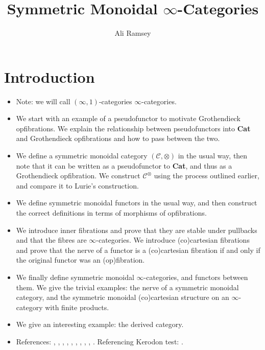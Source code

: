 \documentclass{MetricNotes2023}
\author{Ali Ramsey}
\title{Symmetric Monoidal \(\infty\)-Categories}
\date{\vspace{-5ex}}
\begin{document}
\maketitle
%

\DeclarePairedDelimiter{\norm}{\lVert}{\rVert} 
\DeclarePairedDelimiter{\abs}{\lvert}{\rvert} 
\DeclarePairedDelimiter{\ang}{\langle}{\rangle} 

\section{Introduction}

\begin{itemize}
\item Note: we will call \((\infty, 1)\)-categories \(\infty\)-categories. 
\item We start with an example of a pseudofunctor to motivate Grothendieck opfibrations. We explain the relationship between pseudofunctors into \textbf{Cat} and Grothendieck opfibrations and how to pass between the two.
\item We define a symmetric monoidal category \((	\mathcal{C},\otimes)\) in the usual way, then note that it can be written as a pseudofunctor to \textbf{Cat}, and thus as a Grothendieck opfibration. We construct \(\mathcal{C}^\otimes\) using the process outlined earlier, and compare it to Lurie's construction. 
\item We define symmetric monoidal functors in the usual way, and then construct the correct definitions in terms of morphisms of opfibrations.
\item We introduce inner fibrations and prove that they are stable under pullbacks and that the fibres are \(\infty\)-categories. We introduce (co)cartesian fibrations and prove that the nerve of a functor is a (co)cartesian fibration if and only if the original functor was an (op)fibration. 
\item We finally define symmetric monoidal \(\infty\)-categories, and functors between them. We give the trivial examples: the nerve of a symmetric monoidal category, and the symmetric monoidal (co)cartesian structure on an \(\infty\)-category with finite products.
\item We give an interesting example: the derived category.
\item References:
\autocite{goodfibrations}, \autocite{categorical},  \autocite{symmetricmonoidal}, \autocite{groth2015short}, \autocite{2dimensional},  \autocite{fibrational_notions},  \autocite{higheralgebra}, \autocite{lurie2008higher}, \autocite{kerodon}, \autocite{monoidalgrothendieck}. Referencing Kerodon test: \cite[\href{https://kerodon.net/tag/01UB}{Example 01UB}]{kerodon}. 
\end{itemize}
\end{document}

